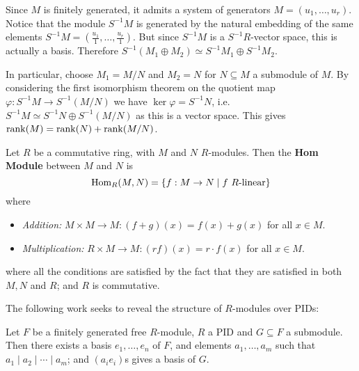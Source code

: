 \documentclass{article}
\begin{document}
\begin{remark}
    Since $M$ is finitely generated, it admits a system of generators $M = (u_1, \ldots, u_r)$. Notice that the module $S^{-1}M$ is generated by the natural embedding of the same elements $S^{-1}M = (\frac{u_1}{1}, \ldots, \frac{u_r}{1})$. But since $S^{-1}M$ is a $S^{-1}R$-vector space, this is actually a basis. Therefore $S^{-1}(M_1 \oplus M_2) \simeq S^{-1} M_1 \oplus S^{-1} M_2$. 
    
    In particular, choose $M_1 = M/N$ and $M_2 = N$ for $N \subseteq M$ a submodule of $M$. By considering the first isomorphism theorem on the quotient map $\varphi: S^{-1}M \to S^{-1}(M/N)$ we have $\ker \varphi = S^{-1}N$, i.e. $S^{-1}M \simeq S^{-1}N \oplus S^{-1}(M/N)$ as this is a vector space. This gives $\mathrm{rank}(M) = \mathrm{rank}(N) + \mathrm{rank}(M/N)$. 
\end{remark}

\begin{definition}
    Let $R$ be a commutative ring, with $M$ and $N$ $R$-modules. Then the \textbf{Hom Module} between $M$ and $N$ is
    \[
        \Hom_R(M, N) = \{ f: M\to N \mid f \ R\text{-linear} \}
    \]
    where 
    \begin{itemize}
        \item \emph{Addition:} $M \times M \to M: (f + g)(x) = f(x) + g(x)$ for all $x\in M$.
        \item \emph{Multiplication:} $R \times M \to M: (rf)(x) = r\cdot f(x)$ for all $x\in M$.
    \end{itemize}
    where all the conditions are satisfied by the fact that they are satisfied in both $M, N$ and $R$; and $R$ is commutative. 
\end{definition}
    
The following work seeks to reveal the structure of $R$-modules over PIDs:

\begin{theorem}\label{thm:Main Structural PID}
    Let $F$ be a finitely generated free $R$-module, $R$ a PID and $G \subseteq F$ a submodule. Then there exists a basis $e_1, \ldots, e_n$ of $F$, and elements $a_1, \ldots, a_m$ such that $a_1\mid a_2\mid\cdots\mid a_m$; and $(a_ie_i)$s gives a basis of $G$. 
\end{theorem}
\end{document}
